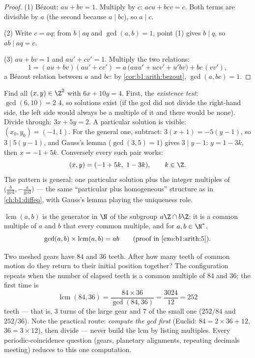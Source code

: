 \begin{proof}
(1) Bézout: $au + bv = 1$. Multiply by $c$: $acu + bcv = c$. Both
terms are divisible by $a$ (the second because $a \mid bc$), so $a
\mid c$.

(2) Write $c = aq$; from $b \mid aq$ and $\gcd(a, b) = 1$, point (1)
gives $b \mid q$, so $ab \mid aq = c$.

(3) $au + bv = 1$ and $au' + cv' = 1$. Multiply the two
relations:
\[
1 = (au + bv)(au' + cv')
= a\,\bigl(auu' + ucv' + u'bv\bigr) + bc\,(vv') ,
\]
a Bézout relation between $a$ and $bc$: by
\cref{cor:b1:arith:bezout}, $\gcd(a, bc) = 1$.
\end{proof}

\begin{example}\label{ex:b1:arith:diophantine}
Find all $(x, y) \in \Z^2$ with $6x + 10y = 4$. First, the
\emph{existence test}: $\gcd(6, 10) = 2$  $4$, so solutions
exist (if the gcd did not divide the right-hand side, the left side
would always be a multiple of it and there would be none). Divide
through: $3x + 5y = 2$. A particular solution is visible: $(x_0,
y_0) = (-1, 1)$. For the general one, subtract: $3(x + 1) = -5(y -
1)$, so $3 \mid 5(y-1)$, and Gauss's lemma ($\gcd(3,5) = 1$) gives
$3 \mid y - 1$: $y = 1 - 3k$, then $x = -1 + 5k$. Conversely every
such pair works:
\[
(x, y) = (-1 + 5k,\ 1 - 3k), \qquad k \in \Z .
\]
The pattern is general: one particular solution plus the integer
multiples of $\bigl(\frac b{\gcd}, -\frac a{\gcd}\bigr)$ --- the
same ``particular plus homogeneous'' structure as in
\cref{ch:b1:diffeq}, with Gauss's lemma playing the uniqueness
role.
\end{example}

\begin{definition}\label{def:b1:arith:lcm}
$\operatorname{lcm}(a, b)$ is the
generator in $\N$ of the subgroup $a\Z \cap b\Z$: it is a common
multiple of $a$ and $b$ that  every common multiple, and for
$a, b \in \N^*$,
\[
\gcd(a,b) \times \operatorname{lcm}(a,b) = ab
\qquad (\text{proof in } \cref{exo:b1:arith:5}).
\]
\end{definition}

\begin{example}\label{ex:b1:arith:gears}
Two meshed gears have $84$ and $36$ teeth. After how many teeth of
common motion do they return to their initial position together?
The configuration repeats when the number of elapsed teeth is a
common multiple of $84$ and $36$; the first time is
\[
\operatorname{lcm}(84, 36) = \frac{84 \times 36}{\gcd(84, 36)}
= \frac{3024}{12} = 252
\]
teeth --- that is, $3$ turns of the large gear and $7$ of the
small one ($252/84$ and $252/36$). Note the practical route:
\emph{compute the gcd first} (Euclid: $84 = 2\times36 + 12$, $36
= 3\times12$), then divide --- never build the lcm by listing
multiples. Every periodic-coincidence question (gears, planetary
alignments, repeating decimals meeting) reduces to this one
computation.
\end{example}

